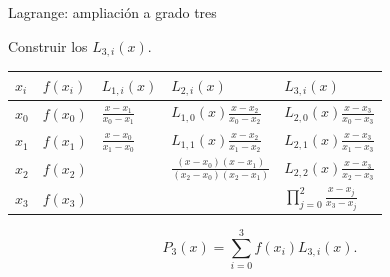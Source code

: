 \documentclass[main.tex]{subfiles}
\begin{document}
\begin{frame}[t]{Lagrange: ampliación a grado tres}
\par\noindent\begin{minipage}[t][12mm][t]{\textwidth}\small\strut Construir los $L_{3,i}(x)$.\end{minipage}\par\nointerlineskip
\begin{minipage}[t]{\textwidth}\begingroup\scriptsize\setlength{\tabcolsep}{3pt}\begin{center}\begin{tabular}{|C{.065\textwidth}|C{.095\textwidth}|C{.19\textwidth}|C{.25\textwidth}|C{.25\textwidth}|}\hline
\rule[-2mm]{0pt}{6mm}$x_i$&$f(x_i)$&$L_{1,i}(x)$&$L_{2,i}(x)$&$L_{3,i}(x)$\\\hline
\rule[-2.5mm]{0pt}{9mm}$x_0$&$f(x_0)$&$\frac{x-x_1}{x_0-x_1}$&$L_{1,0}(x)\frac{x-x_2}{x_0-x_2}$&$L_{2,0}(x)\frac{x-x_3}{x_0-x_3}$\\\hline
\rule[-2.5mm]{0pt}{9mm}$x_1$&$f(x_1)$&$\frac{x-x_0}{x_1-x_0}$&$L_{1,1}(x)\frac{x-x_2}{x_1-x_2}$&$L_{2,1}(x)\frac{x-x_3}{x_1-x_3}$\\\hline
\rule[-2.5mm]{0pt}{9mm}$x_2$&$f(x_2)$&&$\frac{(x-x_0)(x-x_1)}{(x_2-x_0)(x_2-x_1)}$&$L_{2,2}(x)\frac{x-x_3}{x_2-x_3}$\\\hline
\rule[-2.5mm]{0pt}{9mm}$x_3$&$f(x_3)$&&&$\prod_{j=0}^2\frac{x-x_j}{x_3-x_j}$\\\hline
\end{tabular}\end{center}\endgroup\par
\end{minipage}\par\[P_3(x)=\sum_{i=0}^3f(x_i)L_{3,i}(x).\]
\end{frame}
\end{document}
